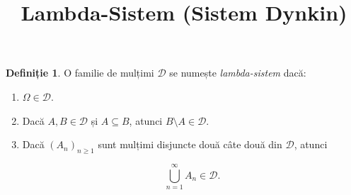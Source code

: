 \documentclass[12pt]{article}
\title{Lambda-Sistem (Sistem Dynkin)}
\author{}
\date{}
\theoremstyle{definition}
\newtheorem{definition}{Definiție}
\begin{document}
\maketitle

\begin{definition}
O familie de mulțimi $\mathcal{D}$ se numește \emph{lambda-sistem} dacă:
\begin{enumerate}
    \item $\Omega \in \mathcal{D}$.
    \item Dacă $A, B \in \mathcal{D}$ și $A \subseteq B$, atunci $B \setminus A \in \mathcal{D}$.
    \item Dacă $(A_n)_{n \ge 1}$ sunt mulțimi disjuncte două câte două din $\mathcal{D}$, atunci
    

\[
        \bigcup_{n=1}^{\infty} A_n \in \mathcal{D}.
    \]


\end{enumerate}
\end{definition}
\end{document}
